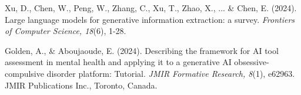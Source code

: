 \begin{thebibliography}{99}
 Xu, D., Chen, W., Peng, W., Zhang, C., Xu, T., Zhao, X., ... \& Chen, E. (2024). Large language models for generative information extraction: a survey. \textit{Frontiers of Computer Science, 18}(6), 1-28.

Golden, A., \& Aboujaoude, E. (2024). Describing the framework for AI tool assessment in mental health and applying it to a generative AI obsessive-compulsive disorder platform: Tutorial. \textit{JMIR Formative Research, 8}(1), e62963. JMIR Publications Inc., Toronto, Canada.

\end{thebibliography} 